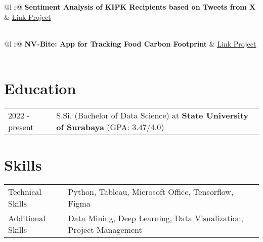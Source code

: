 \documentclass[a4paper,12pt]{article}
\begin{document}
\begin{tabularx}{\linewidth}{ @{}l r@{} }
\textbf{Sentiment Analysis of KIPK Recipients based on Tweets from X} & \hfill \href{https://github.com/rizky-22017-mhs-unesa-ac-id/Sentiment-Analysis-of-KIPK-Recipients-based-on-Tweets-from-X}{Link Project} \\[3.75pt]
 \\
\end{tabularx}

\begin{tabularx}{\linewidth}{ @{}l r@{} }
\textbf{NV-Bite: App for Tracking Food Carbon Footprint} & \hfill \href{https://github.com/NV-Bite}{Link Project} \\[3.75pt]
 \\
\end{tabularx}


\section{Education}
\begin{tabularx}{\linewidth}{@{}l X@{}}	
2022 - present & S.Si. (Bachelor of Data Science) at \textbf{State University of Surabaya} \hfill \normalsize (GPA: 3.47/4.0) \\
\end{tabularx}


\section{Skills}
\begin{tabularx}{\linewidth}{@{}l X@{}}
Technical Skills &  \normalsize{Python, Tableau, Microsoft Office, Tensorflow, Figma} \\
Additional Skills  &  \normalsize{Data Mining, Deep Learning, Data Visualization, Project Management} \\  
\end{tabularx}

\vfill
{}
\end{document}
